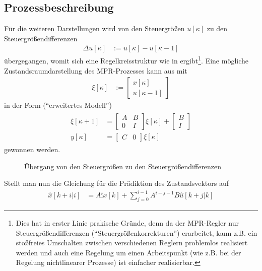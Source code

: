 \subsection{Prozessbeschreibung}
Für die weiteren Darstellungen wird von den Steuergrößen $u[\kappa]$ zu den Steuergrößendifferenzen
\begin{align}
	\Delta u[\kappa] & := u[\kappa]-u[\kappa -1]
\end{align}
übergegangen, womit sich eine Regelkreisstruktur wie in  ergibt\footnote{Dies hat in erster Linie prakische Gründe, denn da der
\ac{MPR}-Regler nur Steuergrößendifferenzen ("`Steuergrößenkorrekturen"') erarbeitet, kann z.B. ein stoßfreies Umschalten zwischen verschiedenen Reglern problemlos realisiert werden und auch eine Regelung um einen Arbeitspunkt
(wie z.B. bei der Regelung nichtlinearer Prozesse) ist einfacher realisierbar.}. Eine mögliche Zustandsraumdarstellung des \ac{MPR}-Prozesses kann aus  mit
\begin{align}
	\xi[\kappa] & := \begin{bmatrix}
	x[\kappa]\\ u[\kappa -1]
	\end{bmatrix}
\end{align}
in der Form ("`erweitertes Modell"')
\begin{align}
\begin{split}\label{eqn:kap_4_erweitertes_modell}
	\xi[\kappa+1] & = \begin{bmatrix}
	A & B\\ 0 & I
	\end{bmatrix}\xi[\kappa]+\begin{bmatrix}
	B\\ I
	\end{bmatrix}\\
	y[\kappa] & = \begin{bmatrix}
	C & 0
	\end{bmatrix}\xi[\kappa]
\end{split}
\end{align}
gewonnen werden.
\begin{figure}[htb]
	\centering
	
	\caption{Übergang von den Steuergrößen zu den Steuergrößendifferenzen}
	\label{fig:kap_4_steuergroessen_differenzen}
\end{figure}
Stellt man nun die Gleichung für die Prädiktion des Zustandsvektors auf
\begin{align}
	\hat{x}[k+i|i] & = Aîx[k]+\sum\limits_{j=0}^{i-1}A^{i-j-1}B\hat{u}[k+j|k]
\end{align}
